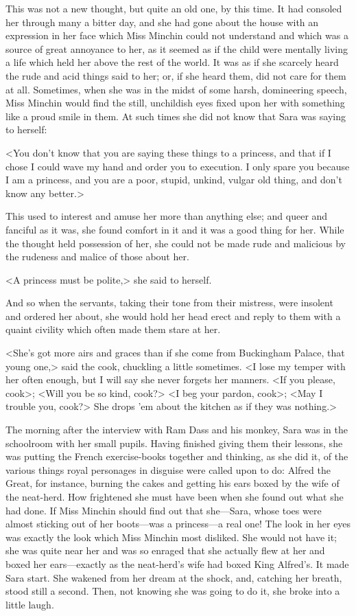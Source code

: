 This was not a new thought, but quite an old one, by this time. It had consoled her through many a bitter day, and she had gone about the house with an expression in her face which Miss Minchin could not understand and which was a source of great annoyance to her, as it seemed as if the child were mentally living a life which held her above the rest of the world. It was as if she scarcely heard the rude and acid things said to her; or, if she heard them, did not care for them at all. Sometimes, when she was in the midst of some harsh, domineering speech, Miss Minchin would find the still, unchildish eyes fixed upon her with something like a proud smile in them. At such times she did not know that Sara was saying to herself:

<You don't know that you are saying these things to a princess, and that if I chose I could wave my hand and order you to execution. I only spare you because I am a princess, and you are a poor, stupid, unkind, vulgar old thing, and don't know any better.>

This used to interest and amuse her more than anything else; and queer and fanciful as it was, she found comfort in it and it was a good thing for her. While the thought held possession of her, she could not be made rude and malicious by the rudeness and malice of those about her.

<A princess must be polite,> she said to herself.

And so when the servants, taking their tone from their mistress, were insolent and ordered her about, she would hold her head erect and reply to them with a quaint civility which often made them stare at her.

<She's got more airs and graces than if she come from Buckingham Palace, that young one,> said the cook, chuckling a little sometimes. <I lose my temper with her often enough, but I will say she never forgets her manners. <If you please, cook>; <Will you be so kind, cook?> <I beg your pardon, cook>; <May I trouble you, cook?> She drops 'em about the kitchen as if they was nothing.>

The morning after the interview with Ram Dass and his monkey, Sara was in the schoolroom with her small pupils. Having finished giving them their lessons, she was putting the French exercise-books together and thinking, as she did it, of the various things royal personages in disguise were called upon to do: Alfred the Great, for instance, burning the cakes and getting his ears boxed by the wife of the neat-herd. How frightened she must have been when she found out what she had done. If Miss Minchin should find out that she—Sara, whose toes were almost sticking out of her boots—was a princess—a real one! The look in her eyes was exactly the look which Miss Minchin most disliked. She would not have it; she was quite near her and was so enraged that she actually flew at her and boxed her ears—exactly as the neat-herd's wife had boxed King Alfred's. It made Sara start. She wakened from her dream at the shock, and, catching her breath, stood still a second. Then, not knowing she was going to do it, she broke into a little laugh.

